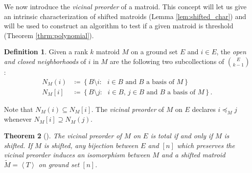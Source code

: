 \documentclass[10pt,a4paper]{amsart}
\makeatletter
\let\laneX@cite\cite
\renewcommand{\cite}{\protect\laneX@citenew}
\newcommand{\laneX@citenew}{\@ifnextchar[{\laneX@cite@a}{\laneX@cite@b}}
\def\laneX@cite@b#1{\laneX@cite{#1}}
\def\laneX@cite@a[#1]{\@ifnextchar[{\laneX@cite@c{#1}}{\laneX@cite@d{#1}}}
\def\laneX@cite@d#1#2{\laneX@cite[#1]{#2}}
\def\laneX@cite@c#1[#2]#3{[\unskip #1 \csname b@#3\endcsname, #2]}
\theoremstyle{definition}
\newtheorem{defn}{Definition}[section]
\theoremstyle{plain}
\newtheorem{thrm}[defn]{Theorem}
\makeatother
\begin{document}
We now introduce the \emph{vicinal preorder} of a matroid. This concept will let us give an intrinsic characterization of shifted matroids (Lemma \ref{lem:shifted_char}) and will be used to construct an algorithm to test if a given matroid is threshold (Theorem \ref{thrm:polynomial}).


\begin{defn}
Given a rank $k$ matroid $M$ on a ground set $E$ and $i\in E$, the \emph{open and closed neighborhoods} of $i$ in $M$ are the following two subcollections of $\binom{E}{k-1}$:
\begin{align*}
N_M(i) &\coloneqq \left\{ B\setminus i : \text{ $i\in B$ and $B$ a basis of $M$}\right\}\\
N_M[i] &\coloneqq \left\{ B\setminus j : \text{ $i\in B$, $j\in B$ and $B$ a basis of $M$}\right\}.
\end{align*}

Note that $N_{M}(i)\subseteq N_{M}[i]$. The \emph{vicinal preorder} of $M$ on $E$ declares $i\preceq_M j$ whenever $N_M[i] \supseteq N_M(j)$.
\end{defn}

\begin{thrm}[{\cite[Theorem $1$]{Klivans}}]
  \label{thrm:vicinal}
The vicinal preorder of $M$ on $E$ is total if and only if $M$ is shifted. If $M$ is shifted, any bijection between $E$ and $[n]$ which preserves the vicinal preorder induces an isomorphism between $M$ and a shifted matroid $\tilde M= \left\langle T \right\rangle$ on ground set $[n]$.
\end{thrm}
\end{document}
